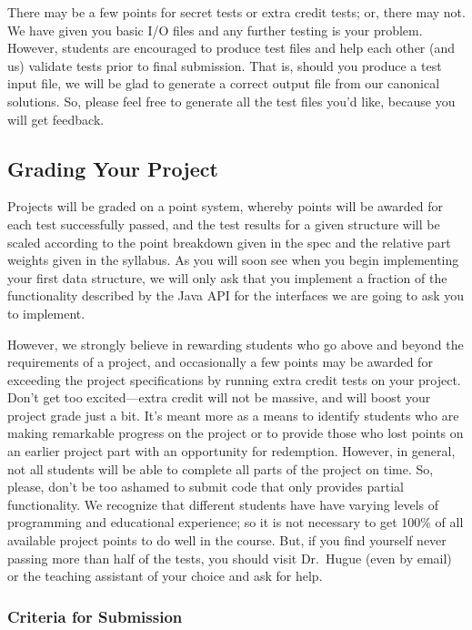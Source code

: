 \documentclass[12pt]{article}
\begin{document}
There may be a few points for secret tests or extra credit tests; or, there may not. We have given you basic
I/O files and any further testing is your problem. However, students
are encouraged to produce test files and help each other (and us)
validate tests prior to final submission. That is, should you produce a test input file, we will be glad to generate a correct output file from our canonical solutions. So, please feel free to generate all the test files you'd like, because you will get feedback.

\subsection{Grading Your Project}
Projects will be graded on a point system, whereby points will be
awarded for each test successfully passed, and the test results for
a given structure will be scaled according to the point breakdown
given in the spec and the relative part weights given in the syllabus.
As you will soon see when
you begin implementing your first data structure, we will only ask
that you implement a fraction of the functionality described by the
Java API for the interfaces we are going to ask you to implement.

However, we strongly believe in rewarding students who go above and
beyond the requirements of a project, and occasionally  a few points
may be awarded for exceeding the project specifications by
running  extra credit tests on your project.
Don't get too excited---extra credit will not be massive, and will boost your
project grade just a bit.  It's meant more as a means to identify students
who are making remarkable progress  on the project or to provide those who lost
points on an earlier project part with an opportunity for redemption.
However, in general, not all students will be able to complete all
parts of the project on time. So, please, don't be too ashamed to submit
code that only provides partial functionality.
We recognize that different students have
 have varying
levels of programming and educational experience; so it is not
necessary to get 100\% of all available project points to do well
in the course. But, if you find yourself never passing more than half
of the tests, you should  visit Dr.~Hugue (even by email) or the
teaching assistant of your choice and ask for help.



\subsubsection{Criteria for Submission}
\end{document}
